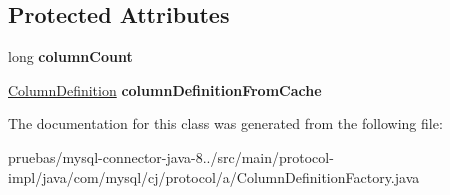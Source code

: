 \subsection*{Protected Attributes}
\begin{DoxyCompactItemize}
\item 
\mbox{\label{classcom_1_1mysql_1_1cj_1_1protocol_1_1a_1_1_column_definition_factory_ab70bfde683438b38a38429595659cd06}} 
long {\bfseries column\+Count}
\item 
\mbox{\label{classcom_1_1mysql_1_1cj_1_1protocol_1_1a_1_1_column_definition_factory_ad0e12e85d3b3530e1e0775eae00255de}} 
\mbox{\hyperlink{interfacecom_1_1mysql_1_1cj_1_1protocol_1_1_column_definition}{Column\+Definition}} {\bfseries column\+Definition\+From\+Cache}
\end{DoxyCompactItemize}


The documentation for this class was generated from the following file\+:\begin{DoxyCompactItemize}
\item 
pruebas/mysql-\/connector-\/java-\/8../src/main/protocol-\/impl/java/com/mysql/cj/protocol/a/Column\+Definition\+Factory.\+java\end{DoxyCompactItemize}
